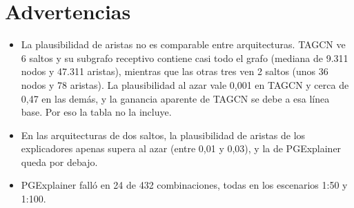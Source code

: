 \section{Advertencias}

\begin{itemize}
  \item La plausibilidad de aristas no es comparable entre arquitecturas. TAGCN ve 6 saltos y
        su subgrafo receptivo contiene casi todo el grafo (mediana de 9.311 nodos y 47.311
        aristas), mientras que las otras tres ven 2 saltos (unos 36 nodos y 78 aristas). La
        plausibilidad al azar vale 0,001 en TAGCN y cerca de 0,47 en las demás, y la ganancia
        aparente de TAGCN se debe a esa línea base. Por eso la tabla no la incluye.
  \item En las arquitecturas de dos saltos, la plausibilidad de aristas de los explicadores
        apenas supera al azar (entre 0,01 y 0,03), y la de PGExplainer queda por debajo.
  \item PGExplainer falló en 24 de 432 combinaciones, todas en los escenarios 1:50 y 1:100.
\end{itemize}
